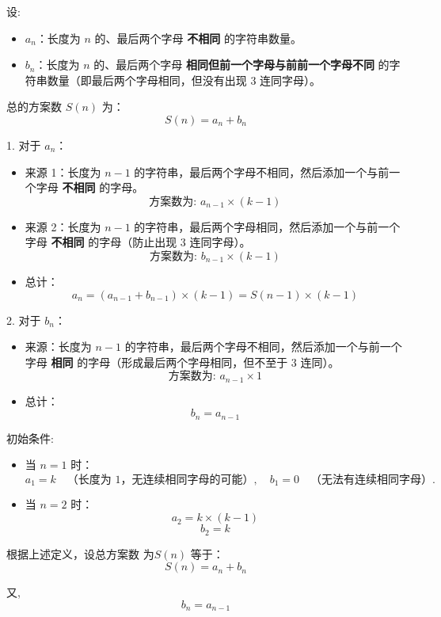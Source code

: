\documentclass{article}
\begin{document}
设:

\begin{itemize}
    \item \( a_n \)：长度为 \( n \) 的、最后两个字母 \textbf{不相同} 的字符串数量。
    \item \( b_n \)：长度为 \( n \) 的、最后两个字母 \textbf{相同但前一个字母与前前一个字母不同} 的字符串数量（即最后两个字母相同，但没有出现 3 连同字母）。
\end{itemize}

总的方案数 \( S(n) \) 为：
\[
S(n) = a_n + b_n
\]

1. 对于 \( a_n \)：
   \begin{itemize}
       \item 来源 1：长度为 \( n-1 \) 的字符串，最后两个字母不相同，然后添加一个与前一个字母 \textbf{不相同} 的字母。
       \[
       \text{方案数为: } a_{n-1} \times (k - 1)
       \]
       \item 来源 2：长度为 \( n-1 \) 的字符串，最后两个字母相同，然后添加一个与前一个字母 \textbf{不相同} 的字母（防止出现 3 连同字母）。
       \[
       \text{方案数为:  }  b_{n-1} \times (k - 1)
       \]
       \item 总计：
       \[
       a_n = (a_{n-1} + b_{n-1}) \times (k - 1) = S(n-1) \times (k - 1)
       \]
   \end{itemize}

2. 对于 \( b_n \)：
   \begin{itemize}
       \item 来源：长度为 \( n-1 \) 的字符串，最后两个字母不相同，然后添加一个与前一个字母 \textbf{相同} 的字母（形成最后两个字母相同，但不至于 3 连同）。
       \[
       \text{方案数为: } a_{n-1} \times 1
       \]
       \item 总计：
       \[
       b_n = a_{n-1}
       \]
   \end{itemize}

初始条件:

\begin{itemize}
    \item 当 \( n = 1 \) 时：
    \[
    a_1 = k \quad \text{（长度为 1，无连续相同字母的可能）}, \quad b_1 = 0 \quad \text{（无法有连续相同字母）}.
    \]
    \item 当 \( n = 2 \) 时：
    \[
    a_2 = k \times (k - 1)
    \]
    \[
    b_2 =  k
    \]
\end{itemize}

根据上述定义，设总方案数 为\( S(n) \) 等于：
\[
S(n) = a_n + b_n
\]

又,
\[
       b_n = a_{n-1}
       \]
       
\end{document}
